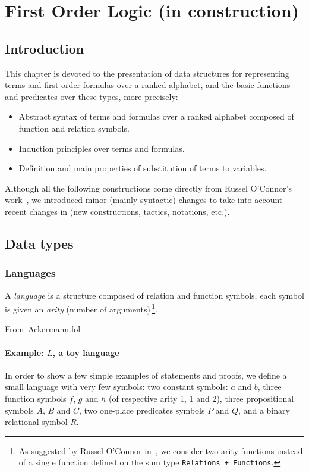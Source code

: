 \chapter{First Order Logic (in construction)}
\label{chap:fol}

\section{Introduction}

This chapter is devoted to the presentation of  data structures for representing terms and first order formulas over a ranked alphabet, and the basic functions and predicates over these types, more precisely:

\begin{itemize}
\item Abstract syntax of terms and formulas over a ranked alphabet composed of function and relation symbols.
\item Induction principles over terms and formulas.
\item Definition and main properties of substitution of terms to variables.
\end{itemize}


Although all the following constructions come directly from Russel O'Connor's work~\cite{Goedel}, we introduced minor (mainly syntactic) changes  to
take into account recent changes in \coq(new constructions, tactics, notations, etc.).


\section{Data types}

\subsection{Languages}

A \emph{language} is a structure composed of relation and function symbols, each symbol is given an \emph{arity} (number of arguments)\,\footnote{As suggested by Russel O'Connor in~\cite{OConnor05}, we consider two arity functions instead of a single function defined on the sum type \texttt{Relations + Functions}.}.

From~\href{../theories/html/hydras.Ackermann.fol.html}{Ackermann.fol}


\subsubsection{Example: $L$, a toy language}
In order to show a few simple examples of statements and proofs, we define a small language with very few symbols:
two constant symbols: $a$ and $b$, three function symbols $f$, $g$ and $h$  (of respective arity 1, 1 and 2), three propositional symbols $A$, $B$ and $C$, two one-place predicates symbols $P$ and $Q$, and a binary relational symbol $R$. 
 
